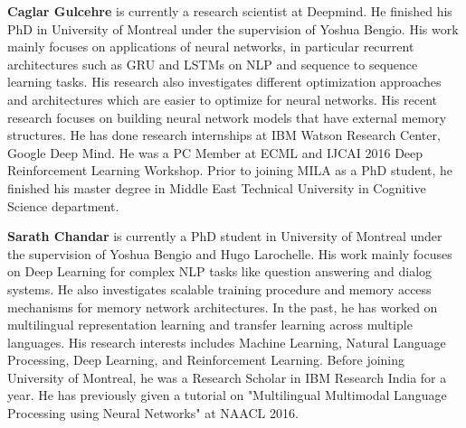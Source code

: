 \begin{bio}
  \textbf{Caglar Gulcehre} is currently a research scientist at Deepmind. He finished his PhD in University of Montreal under the supervision of Yoshua Bengio. His work mainly focuses on applications of neural networks, in particular recurrent architectures such as GRU and LSTMs on NLP and sequence to sequence learning tasks. His research also investigates different optimization approaches and architectures which are easier to optimize for neural networks. His recent research focuses on building neural network models that have external memory structures. He has done research internships at IBM Watson Research Center, Google Deep Mind. He was a PC Member at ECML and IJCAI 2016 Deep Reinforcement Learning Workshop. Prior to joining MILA as a PhD student, he finished his master degree in Middle East Technical University in Cognitive Science department.

 \textbf{Sarath Chandar} is currently a PhD student in University of Montreal under the supervision of Yoshua Bengio and Hugo Larochelle. His work mainly focuses on Deep Learning for complex NLP tasks like question answering and dialog systems. He also investigates scalable training procedure and memory access mechanisms for memory network architectures. In the past, he has worked on multilingual representation learning and transfer learning across multiple languages. His research interests includes Machine Learning, Natural Language Processing, Deep Learning, and Reinforcement Learning. Before joining University of Montreal, he was a Research Scholar in IBM Research India for a year. He has previously given a tutorial on "Multilingual Multimodal Language Processing using Neural Networks" at NAACL 2016. 

\end{bio}

